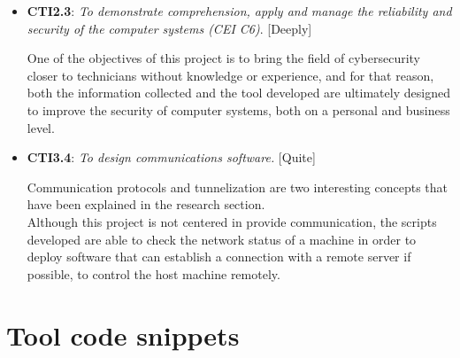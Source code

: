 \begin{itemize}
\item \textbf{CTI2.3}: \textit{To demonstrate comprehension, apply and manage the reliability and security of the computer systems (CEI C6)}. [Deeply]

One of the objectives of this project is to bring the field of cybersecurity closer to technicians without knowledge or experience, and for that reason, both the information collected and the tool developed are ultimately designed to improve the security of computer systems, both on a personal and business level.

\item \textbf{CTI3.4}: \textit{To design communications software.} [Quite]

Communication protocols and tunnelization are two interesting concepts that have been explained in the research section.\\
Although this project is not centered in provide communication, the scripts developed are able to check the network status of a machine in order to deploy software that can establish a connection with a remote server if possible, to control the host machine remotely. 

\end{itemize}

\pagebreak
\section{Tool code snippets}
\label{sec:toolCode}

